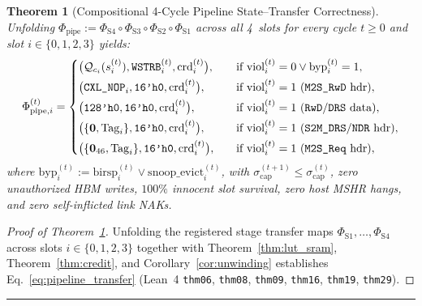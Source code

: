 \documentclass[10pt,twocolumn]{article}
\makeatletter
\newif\ifspecintwocol \specintwocolfalse
\newif\ifspecresume   \specresumefalse
\newcommand{\StartTwoCol}{%
  \if@twocolumn
    \let\spec@next\@empty
  \else
    \ifspecintwocol
      \let\spec@next\@empty
    \else
      \global\specintwocoltrue
      \def\spec@next{\begin{multicols}{2}}%
    \fi
  \fi
  \spec@next
}
\newcommand{\EndConnesPlate}{%
  \par\vspace{3pt}\noindent\textcolor{black!25}{\rule{\textwidth}{0.4pt}}\par\vspace{4pt}%
  \ifspecresume
    \global\specresumefalse
    \let\spec@platepost\StartTwoCol
  \else
    \let\spec@platepost\@empty
  \fi
  \spec@platepost
}
\theoremstyle{spectralthm}
\newtheorem{theorem}{Theorem}[section]
\makeatother
\begin{document}
\begin{theorem}[Compositional 4-Cycle Pipeline State--Transfer Correctness]
\label{thm:pipeline_comp}
Unfolding $\Phi_{\mathrm{pipe}} := \Phi_{\mathrm{S4}} \circ \Phi_{\mathrm{S3}} \circ \Phi_{\mathrm{S2}} \circ \Phi_{\mathrm{S1}}$ across all 4~slots for every cycle $t \ge 0$ and slot $i \in \{0,1,2,3\}$ yields:
\begin{equation}
\label{eq:pipeline_transfer}
\Phi_{\mathrm{pipe},i}^{(t)} =
\begin{dcases}
\bigl(\mathcal{Q}_{c_i}(s_i^{(t)}), \texttt{WSTRB}_i^{(t)}, \mathrm{crd}_i^{(t)}\bigr), &\quad\text{if } \mathrm{viol}_i^{(t)}=0 \vee \mathrm{byp}_i^{(t)}=1,\\
\bigl(\texttt{CXL\_NOP}_i, \texttt{16'h0}, \mathrm{crd}_i^{(t)}\bigr), &\quad\text{if } \mathrm{viol}_i^{(t)}=1\text{ (\texttt{M2S\_RwD} hdr)},\\
\bigl(\texttt{128'h0}, \texttt{16'h0}, \mathrm{crd}_i^{(t)}\bigr), &\quad\text{if } \mathrm{viol}_i^{(t)}=1\text{ (\texttt{RwD}/\texttt{DRS} data)},\\
\bigl(\{\mathbf{0}, \mathrm{Tag}_i\}, \texttt{16'h0}, \mathrm{crd}_i^{(t)}\bigr), &\quad\text{if } \mathrm{viol}_i^{(t)}=1\text{ (\texttt{S2M\_DRS}/\texttt{NDR} hdr)},\\
\bigl(\{\mathbf{0}_{46}, \mathrm{Tag}_i\}, \texttt{16'h0}, \mathrm{crd}_i^{(t)}\bigr), &\quad\text{if } \mathrm{viol}_i^{(t)}=1\text{ (\texttt{M2S\_Req} hdr)},
\end{dcases}
\end{equation}
where $\mathrm{byp}_i^{(t)} := \mathrm{birsp}_i^{(t)} \vee \mathrm{snoop\_evict}_i^{(t)}$, with $\sigma_{\mathrm{cap}}^{(t+1)} \le \sigma_{\mathrm{cap}}^{(t)}$, zero unauthorized HBM writes, $100\%$ innocent slot survival, zero host MSHR hangs, and zero self-inflicted link NAKs.
\end{theorem}
\begin{proof}[Proof of Theorem~\ref{thm:pipeline_comp}]
Unfolding the registered stage transfer maps $\Phi_{\mathrm{S1}},\ldots,\Phi_{\mathrm{S4}}$ across slots $i \in \{0,1,2,3\}$ together with Theorem~\ref{thm:lut_sram}, Theorem~\ref{thm:credit}, and Corollary~\ref{cor:unwinding} establishes Eq.~\eqref{eq:pipeline_transfer} (Lean~4 \texttt{thm06}, \texttt{thm08}, \texttt{thm09}, \texttt{thm16}, \texttt{thm19}, \texttt{thm29}).
\end{proof}
\EndConnesPlate
\end{document}
